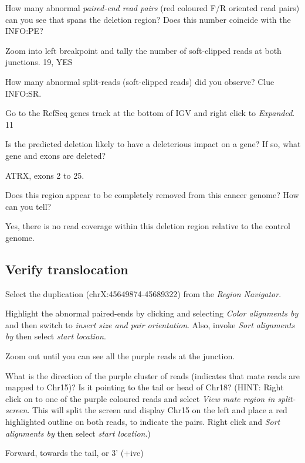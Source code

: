 \begin{questions}
How many abnormal \emph{paired-end read pairs} (red coloured F/R oriented read pairs) can you see that spans the deletion region? Does this number coincide with the INFO:PE? 
\begin{answer}
Zoom into left breakpoint and tally the number of soft-clipped reads at both junctions.
19, YES
\end{answer}

How many abnormal split-reads (soft-clipped reads) did you observe? Clue INFO:SR.
\begin{answer}
Go to the RefSeq genes track at the bottom of IGV and right click to \emph{Expanded}.
11
\end{answer}
Is the predicted deletion likely to have a deleterious impact on a gene? If so, what gene and exons are deleted?
\begin{answer}
ATRX, exons 2 to 25.
\end{answer}
Does this region appear to be completely removed from this cancer genome? How can you tell?
\begin{answer}
Yes, there is no read coverage within this deletion region relative to the control genome. 
\end{answer}
\end{questions}




\subsection{Verify translocation}
\begin{advanced}

\begin{steps}
Select the duplication (chrX:45649874-45689322) from the \emph{Region Navigator}. 

Highlight the abnormal paired-ends by clicking and selecting \emph{Color alignments by} and then switch to \emph{insert size and pair orientation}. Also, invoke \emph{Sort alignments by} then select \emph{start location}.

Zoom out until you can see all the purple reads at the junction.
\end{steps}
\end{advanced}


\begin{questions}
What is the direction of the purple cluster of reads (indicates that mate reads are mapped to Chr15)? Is it pointing to the tail or head of Chr18? 
(HINT: Right click on to one of the purple coloured reads and select \emph{View mate region in split-screen}. This will split the screen and display Chr15 on the left and place a red highlighted outline on both reads, to indicate the pairs. Right click and \emph{Sort alignments by} then select \emph{start location}.)
\begin{answer}
Forward, towards the tail, or 3’ (+ive)
\end{answer}
\end{questions}

